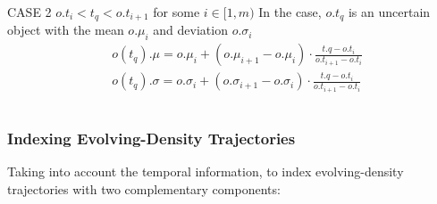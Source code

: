 \begin{frame}
\begin{columns}
  \begin{block}{CASE 2 \quad $o.t_i < t_q < o.t_{i+1}$ for some $i \in [1, m)$}
    In the case, $o.t_q$ is an uncertain object with the mean $o.\mu_i$ and deviation $o.\sigma_i$
    \vspace{-10pt}
    \begin{equation*}
      \begin{split}
      & o(t_q).\mu = o.\mu_i + (o.\mu_{i+1} - o.\mu_i) \cdot \frac{t.q-o.t_i}{o.t_{i+1}-o.t_i} \\
      & o(t_q).\sigma = o.\sigma_i + (o.\sigma_{i+1} - o.\sigma_i) \cdot \frac{t.q-o.t_i}{o.t_{i+1}-o.t_i}
      \end{split}
    \end{equation*}
  \end{block}

\end{columns}

\end{frame}


\begin{frame}
\frametitle{Indexing Evolving-Density Trajectories}

Taking into account the temporal information, to index evolving-density trajectories with two complementary components:


\end{frame}
